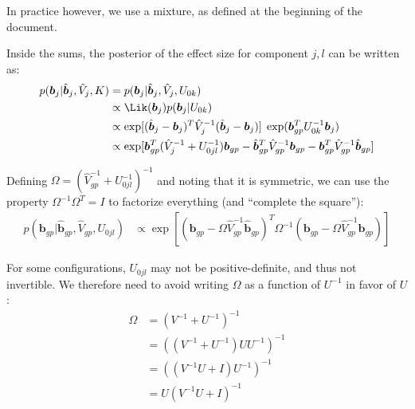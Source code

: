 \documentclass[11pt, oneside]{article}   	%
\begin{document}
In practice however, we use a mixture, as defined at the beginning of the document.


Inside the sums, the posterior of the effect size for component $j,l$ can be written as:
\begin{equation}
  \begin{aligned}
    p(\bm{b}_{j} | \hat{\bm{b}}_{j}, \hat{V}_{j}, K) &= p(\bm{b}_{j} | \hat{\bm{b}}_{j}, \hat{V}_{j}, U_{0k}) \\
    &\propto \Lik(\bm{b}_{j}) p(\bm{b}_{j} | U_{0k}) \\
    &\propto \exp[(\hat{\bm{b}}_{j} - \bm{b}_{j})^T \hat{V}_{j}^{-1} (\hat{\bm{b}}_{j} - \bm{b}_{j})] \; \exp(\bm{b}_{gp}^T U_{0k}^{-1} \bm{b}_{j}) \\
    &\propto \exp[\bm{b}_{gp}^T (\hat{V}_{j}^{-1} + U_{0jl}^{-1}) \bm{b}_{gp} - \hat{\bm{b}}_{gp}^T \hat{V}_{gp}^{-1} \bm{b}_{gp} - \bm{b}_{gp}^T \hat{V}_{gp}^{-1} \hat{\bm{b}}_{gp}]
  \end{aligned}
\end{equation}

Defining $\Omega = (\hat{V}_{gp}^{-1} + U_{0jl}^{-1})^{-1}$ and noting that it is symmetric, we can use the property $\Omega^{-1} \Omega^T = I$ to factorize everything (and ``complete the square''):
\begin{equation}
  \begin{aligned}
    p(\bm{b}_{gp} | \hat{\bm{b}}_{gp}, \hat{V}_{gp}, U_{0jl}) &\propto \exp[(\bm{b}_{gp} - \Omega \hat{V}_{gp}^{-1} \hat{\bm{b}}_{gp})^T \Omega^{-1} (\bm{b}_{gp} - \Omega \hat{V}_{gp}^{-1} \hat{\bm{b}}_{gp})]
  \end{aligned}
\end{equation}

For some configurations, $U_{0jl}$ may not be positive-definite, and thus not invertible.
We therefore need to avoid writing $\Omega$ as a function of $U^{-1}$ in favor of $U$:
\begin{equation}
  \label{omega}
  \begin{aligned}
    \Omega &= (V^{-1} + U^{-1})^{-1} \\
    &= ((V^{-1} + U^{-1}) U U^{-1})^{-1} \\
    &= ((V^{-1} U + I) U^{-1})^{-1} \\
    &= U (V^{-1} U + I)^{-1}
  \end{aligned}
\end{equation}
\end{document}

